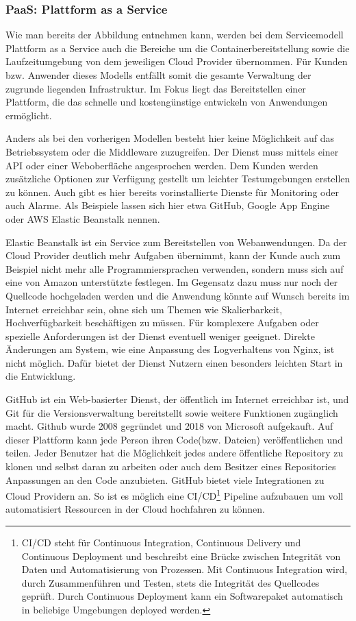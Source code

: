    \subsubsection{PaaS: Plattform as a Service}
   Wie man bereits der Abbildung entnehmen kann, werden bei dem Servicemodell Plattform as a Service auch die Bereiche um die
   Containerbereitstellung sowie die Laufzeitumgebung von dem jeweiligen Cloud Provider übernommen. Für Kunden bzw. Anwender dieses Modells
   entfällt somit die gesamte Verwaltung der zugrunde liegenden Infrastruktur. Im Fokus liegt das Bereitstellen einer Plattform, die das
   schnelle und kostengünstige entwickeln von Anwendungen ermöglicht.


   Anders als bei den vorherigen Modellen besteht hier keine Möglichkeit auf das Betriebssystem oder die Middleware zuzugreifen.
   Der Dienst muss mittels einer API oder einer Weboberfläche angesprochen werden.
   Dem Kunden werden zusätzliche Optionen zur Verfügung gestellt um leichter Testumgebungen erstellen zu können.
   Auch gibt es hier bereits vorinstallierte Dienste für Monitoring oder auch Alarme.
   Als Beispiele lassen sich hier etwa GitHub, Google App Engine oder AWS Elastic Beanstalk nennen.


   Elastic Beanstalk ist ein Service zum Bereitstellen von Webanwendungen. Da der Cloud Provider deutlich mehr Aufgaben übernimmt, kann der Kunde
   auch zum Beispiel nicht mehr alle Programmiersprachen verwenden, sondern muss sich auf eine von Amazon unterstützte festlegen.
   Im Gegensatz dazu muss nur noch der Quellcode hochgeladen werden und die Anwendung könnte auf Wunsch bereits im Internet erreichbar sein, ohne sich um Themen
   wie Skalierbarkeit, Hochverfügbarkeit beschäftigen zu müssen. Für komplexere Aufgaben oder spezielle Anforderungen ist der Dienst eventuell weniger geeignet.
   Direkte Änderungen am System, wie eine Anpassung des Logverhaltens von Nginx, ist nicht möglich. Dafür bietet der Dienst
   Nutzern einen besonders leichten Start in die Entwicklung.

   GitHub ist ein Web-basierter Dienst, der öffentlich im Internet erreichbar ist, und Git für die Versionsverwaltung bereitstellt sowie weitere Funktionen zugänglich macht.
   Github wurde 2008 gegründet und 2018 von Microsoft aufgekauft. Auf dieser Plattform kann jede Person ihren Code(bzw. Dateien) veröffentlichen und teilen.
   Jeder Benutzer hat die Möglichkeit jedes andere öffentliche Repository zu klonen und selbst daran zu arbeiten oder auch dem Besitzer eines Repositories
   Anpassungen an den Code anzubieten. GitHub bietet viele Integrationen zu Cloud Providern an. So ist es möglich eine CI/CD\footnote{CI/CD steht für
   Continuous Integration, Continuous Delivery und Continuous Deployment und beschreibt eine Brücke zwischen Integrität von Daten und Automatisierung von Prozessen.
   Mit Continuous Integration wird, durch Zusammenführen und Testen, stets die Integrität des Quellcodes geprüft.
   Durch Continuous Deployment kann ein Softwarepaket automatisch in beliebige Umgebungen deployed werden. } Pipeline aufzubauen um voll automatisiert Ressourcen in der Cloud hochfahren zu können. \cite[]{GitHub}


